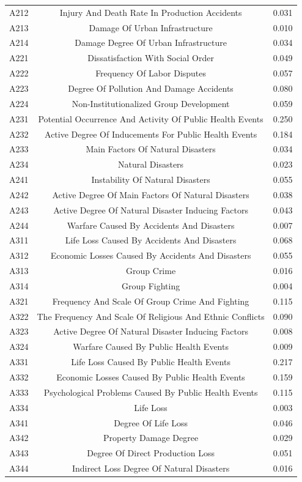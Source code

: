 \documentclass[12pt]{article}  %
\begin{document}
\begin{table}[ht]
{\begin{tabular}{ccc}
        A212 & Injury And Death Rate In Production Accidents&0.031  \\ 
        A213 & Damage Of Urban Infrastructure&0.010 \\ 
        A214 & Damage Degree Of Urban Infrastructure &0.034 \\ 
        A221 & Dissatisfaction With Social Order &0.049 \\ 
        A222 & Frequency Of Labor Disputes &0.057 \\ 
        A223 & Degree Of Pollution And Damage Accidents &0.080 \\ 
        A224 & Non-Institutionalized Group Development &0.059 \\ 
        A231 & Potential Occurrence And Activity Of Public Health Events &0.250 \\ 
        A232 & Active Degree Of Inducements For Public Health Events &0.184 \\ 
        A233 & Main Factors Of Natural Disasters &0.034\\ 
        A234 & Natural Disasters &0.023\\ 
        A241 & Instability Of Natural Disasters &0.055 \\ 
        A242 & Active Degree Of Main Factors Of Natural Disasters  &0.038\\ 
        A243 & Active Degree Of Natural Disaster Inducing Factors  &0.043\\ 
        A244 & Warfare Caused By Accidents And Disasters &0.007 \\ 
        A311 & Life Loss Caused By Accidents And Disasters &0.068 \\ 
        A312 & Economic Losses Caused By Accidents And Disasters  &0.055\\ 
        A313 & Group Crime &0.016 \\ 
        A314 & Group Fighting  &0.004\\ 
        A321 & Frequency And Scale Of Group Crime And Fighting&0.115  \\ 
        A322 & The Frequency And Scale Of Religious And Ethnic Conflicts &0.090 \\ 
        A323 & Active Degree Of Natural Disaster Inducing Factors  &0.008\\ 
        A324 & Warfare Caused By Public Health Events &0.009 \\ 
        A331 & Life Loss Caused By Public Health Events &0.217\\ 
        A332 & Economic Losses Caused By Public Health Events &0.159 \\ 
        A333 & Psychological Problems Caused By Public Health Events &0.115 \\ 
        A334 & Life Loss &0.003 \\ 
        A341 & Degree Of Life Loss &0.046\\ 
        A342 & Property Damage Degree&0.029  \\ 
        A343 & Degree Of Direct Production Loss&0.051  \\ 
        A344 & Indirect Loss Degree Of Natural Disasters&0.016  \\ \hline
    \end{tabular}}
\end{table}
\end{document}

